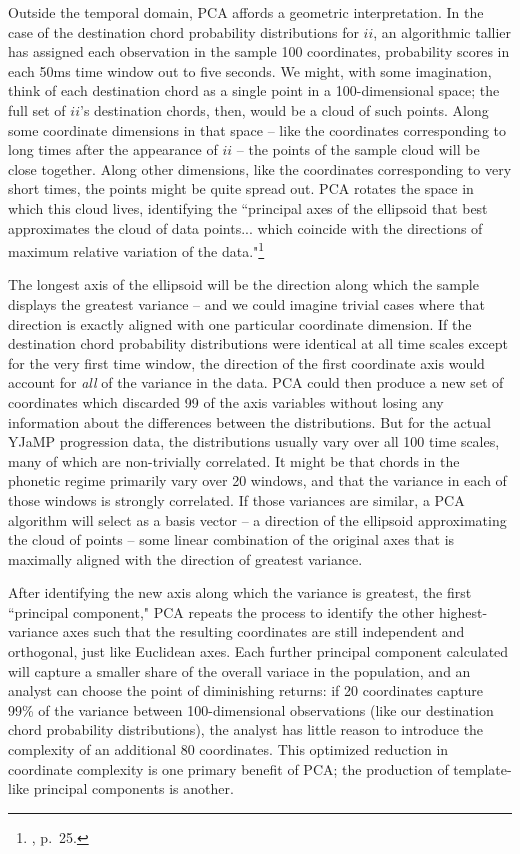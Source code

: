 Outside the temporal domain, PCA affords a geometric interpretation.  In the case of the destination chord probability distributions for $ii$, an algorithmic tallier has assigned each observation in the sample 100 coordinates, probability scores in each 50ms time window out to five seconds.  We might, with some imagination, think of each destination chord as a single point in a 100-dimensional space; the full set of $ii$'s destination chords, then, would be a cloud of such points.  Along some coordinate dimensions in that space -- like the coordinates corresponding to long times after the appearance of $ii$ -- the points of the sample cloud will be close together.  Along other dimensions, like the coordinates corresponding to very short times, the points might be quite spread out.  PCA rotates the space in which this cloud lives, identifying the ``principal axes of the ellipsoid that best approximates the cloud of data points... which coincide with the directions of maximum relative variation of the data."\footnote{\cite{benadon2015}, p.\ 25.}

The longest axis of the ellipsoid will be the direction along which the sample displays the greatest variance -- and we could imagine trivial cases where that direction is exactly aligned with one particular coordinate dimension.  If the destination chord probability distributions were identical at all time scales except for the very first time window, the direction of the first coordinate axis would account for \emph{all} of the variance in the data.  PCA could then produce a new set of coordinates which discarded 99 of the axis variables without losing any information about the differences between the distributions.  But for the actual YJaMP progression data, the distributions usually vary over all 100 time scales, many of which are non-trivially correlated.  It might be that chords in the phonetic regime primarily vary over 20 windows, and that the variance in each of those windows is strongly correlated.  If those variances are similar, a PCA algorithm will select as a basis vector -- a direction of the ellipsoid approximating the cloud of points -- some linear combination of the original axes that is maximally aligned with the direction of greatest variance.

After identifying the new axis along which the variance is greatest, the first ``principal component," PCA repeats the process to identify the other highest-variance axes such that the resulting coordinates are still independent and orthogonal, just like Euclidean axes.  Each further principal component calculated will capture a smaller share of the overall variace in the population, and an analyst can choose the point of diminishing returns: if 20 coordinates capture 99\% of the variance between 100-dimensional observations (like our destination chord probability distributions), the analyst has little reason to introduce the complexity of an additional 80 coordinates.  This optimized reduction in coordinate complexity is one primary benefit of PCA; the production of template-like principal components is another.

